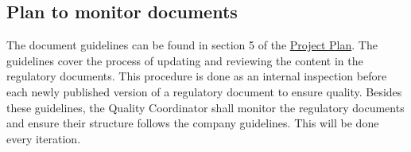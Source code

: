\subsection{Plan to monitor documents}
\label{subsec:monitor-docs}
The document guidelines can be found in section 5 of the \href{https://gitlab.liu.se/tddc88-company-1-2021/deploy/-/tree/main/documents/Project\%20Plan}{Project Plan}. The guidelines cover the process of updating and reviewing the content in the regulatory documents. This procedure is done as an internal inspection before each newly published version of a regulatory document to ensure quality. Besides these guidelines, the Quality Coordinator shall monitor the regulatory documents and ensure their structure follows the company guidelines. This will be done every iteration.


